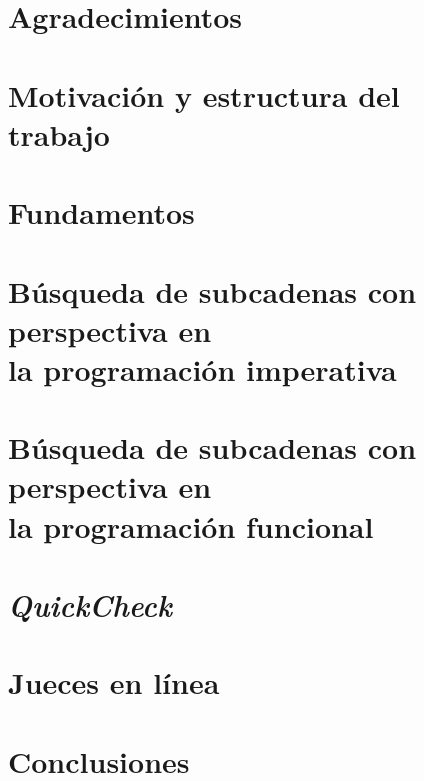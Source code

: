 \documentclass{book}
\begin{document}
\thispagestyle{empty}
\frontmatter
    
    \clearpage
    \mbox{}
    \clearpage
    \thispagestyle{empty}
    
    
    
    \chapter*{Agradecimientos}
    
    \clearpage
    
    \tableofcontents

\mainmatter
    \chapter*{Motivación y estructura del trabajo}
        
    
    \chapter{Fundamentos}
        
    
    \chapter{Búsqueda de subcadenas con perspectiva en \\la programación imperativa}
    \chaptermark{} %
        
    
    \chapter{Búsqueda de subcadenas con perspectiva en \\la programación funcional}
    \chaptermark{} %
        

    \chapter{\textit{QuickCheck}}
        

    \chapter{Jueces en línea}
        
    
    \chapter{Conclusiones}
        
    
    \begin{appendices}
        
        
                    
    \end{appendices}

\backmatter
    \nocite{*}
    \printbibliography
\end{document}
